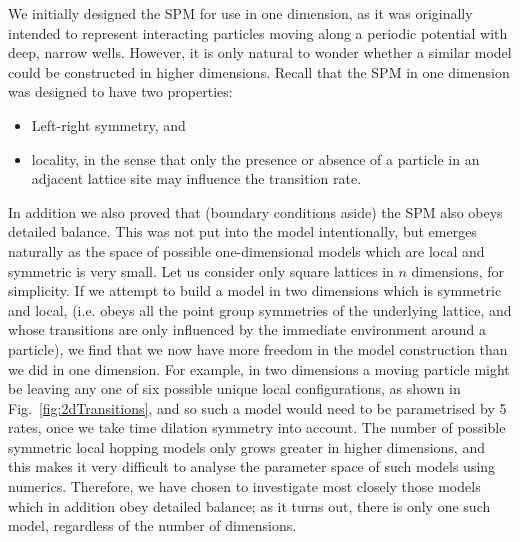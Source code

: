 We initially designed the SPM for use in one dimension, as it was originally intended to represent interacting particles moving along a periodic potential with deep, narrow wells. However, it is only natural to wonder whether a similar
model could be constructed in higher dimensions. Recall that the SPM in one dimension was designed to have two properties:
\begin{itemize}
 \item Left-right symmetry, and
 \item locality, in the sense that only the presence or absence of a particle in an adjacent lattice site may influence the transition rate.
\end{itemize}
In addition we also proved that (boundary conditions aside) the SPM also obeys detailed balance. This was not put into the model intentionally, but emerges naturally as the space of possible one-dimensional
models which are local and symmetric is very small.
Let us consider only square lattices in $n$ dimensions, for simplicity. If we attempt to build a model in two dimensions which is symmetric and local, (i.e. obeys all the point group symmetries of the underlying lattice, and whose transitions
are only influenced by the immediate environment around a particle), we find that we now have more freedom in the model construction than we did in one dimension. For example, in two dimensions a moving particle might be leaving
any one of six possible unique local configurations, as shown in Fig.~\ref{fig:2dTransitions}, and so such a model would need to be parametrised by 5 rates, once we take time dilation symmetry into account. The number of possible
symmetric local hopping models only grows greater in higher dimensions, and this makes it very difficult to analyse the parameter space of such models using numerics. Therefore, we have chosen to investigate most closely those models
which in addition obey detailed balance; as it turns out, there is only one such model, regardless of the number of dimensions.
